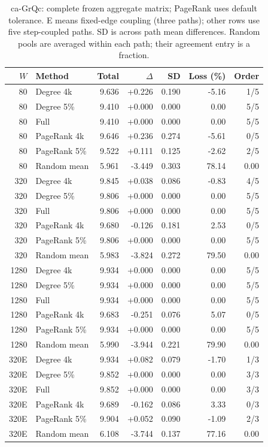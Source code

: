\clearpage
\begin{table}[htbp]
\caption{ca-GrQc: complete frozen aggregate matrix; PageRank uses default tolerance. E means fixed-edge coupling (three paths); other rows use five step-coupled paths. SD is across path mean differences. Random pools are averaged within each path; their agreement entry is a fraction.}\label{tab:s-ca_grqc}
\begin{tabular}{rlrrrrr}
\toprule
$W$ & Method & Total & $\Delta$ & SD & Loss (\%) & Order \\
\midrule
80 & Degree 4k & 9.636 & +0.226 & 0.190 & -5.16 & 1/5 \\
80 & Degree 5\% & 9.410 & +0.000 & 0.000 & 0.00 & 5/5 \\
80 & Full & 9.410 & +0.000 & 0.000 & 0.00 & 5/5 \\
80 & PageRank 4k & 9.646 & +0.236 & 0.274 & -5.61 & 0/5 \\
80 & PageRank 5\% & 9.522 & +0.111 & 0.125 & -2.62 & 2/5 \\
80 & Random mean & 5.961 & -3.449 & 0.303 & 78.14 & 0.00 \\
320 & Degree 4k & 9.845 & +0.038 & 0.086 & -0.83 & 4/5 \\
320 & Degree 5\% & 9.806 & +0.000 & 0.000 & 0.00 & 5/5 \\
320 & Full & 9.806 & +0.000 & 0.000 & 0.00 & 5/5 \\
320 & PageRank 4k & 9.680 & -0.126 & 0.181 & 2.53 & 0/5 \\
320 & PageRank 5\% & 9.806 & +0.000 & 0.000 & 0.00 & 5/5 \\
320 & Random mean & 5.983 & -3.824 & 0.272 & 79.50 & 0.00 \\
1280 & Degree 4k & 9.934 & +0.000 & 0.000 & 0.00 & 5/5 \\
1280 & Degree 5\% & 9.934 & +0.000 & 0.000 & 0.00 & 5/5 \\
1280 & Full & 9.934 & +0.000 & 0.000 & 0.00 & 5/5 \\
1280 & PageRank 4k & 9.683 & -0.251 & 0.076 & 5.07 & 0/5 \\
1280 & PageRank 5\% & 9.934 & +0.000 & 0.000 & 0.00 & 5/5 \\
1280 & Random mean & 5.990 & -3.944 & 0.221 & 79.90 & 0.00 \\
320E & Degree 4k & 9.934 & +0.082 & 0.079 & -1.70 & 1/3 \\
320E & Degree 5\% & 9.852 & +0.000 & 0.000 & 0.00 & 3/3 \\
320E & Full & 9.852 & +0.000 & 0.000 & 0.00 & 3/3 \\
320E & PageRank 4k & 9.689 & -0.162 & 0.086 & 3.33 & 0/3 \\
320E & PageRank 5\% & 9.904 & +0.052 & 0.090 & -1.09 & 2/3 \\
320E & Random mean & 6.108 & -3.744 & 0.137 & 77.16 & 0.00 \\
\bottomrule
\end{tabular}
\end{table}

